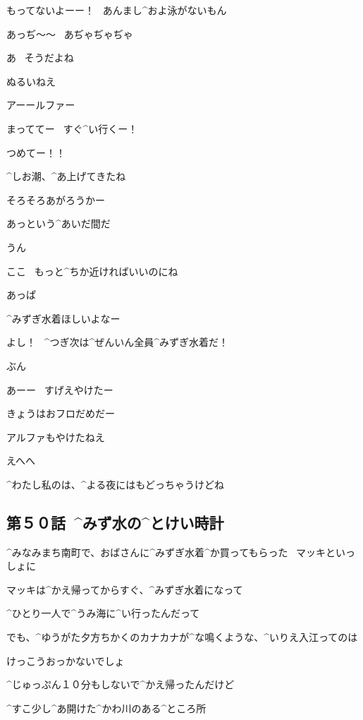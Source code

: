 \Takahiro もってないよーー！
\ あんまし^{およ}{泳}がないもん

\Takahiro あっぢ〜〜
\ あぢゃぢゃぢゃ

\Alpha あ
\ そうだよね

\page[82]
\Makki ぬるいねえ

\Takahiro アーールファー

\Alpha まっててー
\ すぐ^{い}{行}くー！

\page[84]
\Takahiro つめてー！！

\Alpha ^{しお}{潮}、^{あ}{上}げてきたね

\Alpha そろそろあがろうかー

\page[85]
\Takahiro あっという^{あいだ}{間}だ

\Alpha うん

\Makki ここ
\ もっと^{ちか}{近}ければいいのにね

\Takahiro あっぱ

\Takahiro ^{みずぎ}{水着}ほしいよなー

\Alpha よし！
\ ^{つぎ}{次}は^{ぜんいん}{全員}^{みずぎ}{水着}だ！

\Alpha ぶん

\page[86]
\Takahiro あーー
\ すげえやけたー

\Makki きょうはおフロだめだー

\Takahiro アルファもやけたねえ

\Alpha えへへ

\Alpha ^{わたし}{私}のは、^{よる}{夜}にはもどっちゃうけどね


\subsection{第５０話\ ^{みず}{水}の^{とけい}{時計}}

\page[90]
\Takahiro ^{みなみまち}{南町}で、おばさんに^{みずぎ}{水着}^{か}{買}ってもらった
\ マッキといっしょに

\Takahiro マッキは^{かえ}{帰}ってからすぐ、^{みずぎ}{水着}になって

\Takahiro ^{ひとり}{一人}で^{うみ}{海}に^{い}{行}ったんだって

\page[91]
\Takahiro でも、^{ゆうがた}{夕方}ちかくのカナカナが^{な}{鳴}くような、^{いりえ}{入江}ってのは

\Takahiro けっこうおっかないでしょ

\Takahiro ^{じゅっぷん}{１０分}もしないで^{かえ}{帰}ったんだけど

\Takahiro ^{すこ}{少}し^{あ}{開}けた^{かわ}{川}のある^{ところ}{所}

